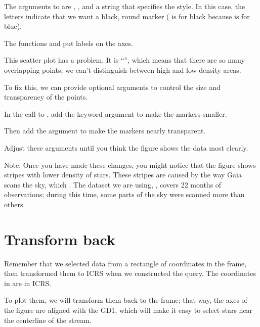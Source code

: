 \documentclass[letterpaper,10pt,english]{sphinxmanual}
\begin{document}
The arguments to  are , , and a string that specifies the style.  In this case, the letters  indicate that we want a black, round marker ( is for black because  is for blue).

The functions  and  put labels on the axes.

This scatter plot has a problem.  It is “”, which means that there are so many overlapping points, we can’t distinguish between high and low density areas.

To fix this, we can provide optional arguments to control the size and transparency of the points.

 In the call to , add the keyword argument  to make the markers smaller.

Then add the argument  to make the markers nearly transparent.

Adjust these arguments until you think the figure shows the data most clearly.

Note: Once you have made these changes, you might notice that the figure shows stripes with lower density of stars.  These stripes are caused by the way Gaia scans the sky, which .  The dataset we are using, , covers 22 months of observations; during this time, some parts of the sky were scanned more than others.


\section{Transform back}
\label{\detokenize{03_motion:transform-back}}
Remember that we selected data from a rectangle of coordinates in the  frame, then transformed them to ICRS when we constructed the query.
The coordinates in  are in ICRS.

To plot them, we will transform them back to the  frame; that way, the axes of the figure are aligned with the GD\sphinxhyphen{}1, which will make it easy to select stars near the centerline of the stream.
\end{document}
